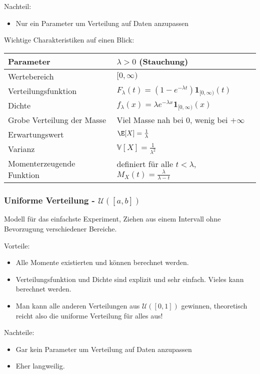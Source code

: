 {Nachteil:}
\begin{itemize}
	\item Nur ein Parameter um Verteilung auf Daten anzupassen
\end{itemize}

Wichtige Charakteristiken auf einen Blick:
\begin{center}
\begin{tabular}[h]{|l|l|}
\hline
Parameter& $\lambda>0$ (Stauchung)\\
\hline
Wertebereich & $[0,\infty)$\\
\hline
Verteilungsfunktion & $F_\lambda(t)= (1-e^{-\lambda t})\mathbf 1_{[0,\infty)}(t) $\\
\hline
Dichte & $f_\lambda(x)=\lambda e^{-\lambda x} \mathbf 1_{[0,\infty)}(x)$\\
\hline
Grobe Verteilung der Masse & Viel Masse nah bei $0$, wenig bei $+\infty$\\
\hline
Erwartungswert& $\E[X]=\frac{1}{\lambda}$ \\
\hline
Varianz & $\mathbb V[X]=\frac{1}{\lambda^2} $\\
\hline
Momenterzeugende Funktion& definiert f\"ur alle $t<\lambda$, $M_X(t)=\frac{\lambda}{\lambda-t}$\\
\hline
\end{tabular}

\end{center}


\subsubsection*{Uniforme Verteilung - $\mathcal U([a,b])$}

Modell f\"ur das einfachste Experiment, Ziehen aus einem Intervall ohne Bevorzugung verschiedener Bereiche.\smallskip

{Vorteile:} 
\begin{itemize}
\item Alle Momente existierten und k\"onnen berechnet werden.
\item Verteilungsfunktion und Dichte sind explizit und sehr einfach. Vieles kann berechnet werden.
\item Man kann alle anderen Verteilungen aus $\mathcal U([0,1])$ gewinnen, theoretisch reicht also die uniforme Verteilung f\"ur alles aus!
\end{itemize}

{Nachteile:}
\begin{itemize}
	\item Gar kein Parameter um Verteilung auf Daten anzupassen
	\item Eher langweilig.
\end{itemize}

